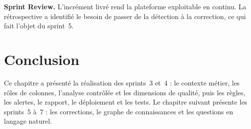 
\noindent\textbf{Sprint Review.} L'incrément livré rend la plateforme exploitable en continu. La rétrospective a identifié le besoin de passer de la détection à la correction, ce qui fait l'objet du sprint~5.

\section*{Conclusion}
Ce chapitre a présenté la réalisation des sprints~3 et~4 : le contexte métier, les rôles de colonnes, l'analyse contrôlée et les dimensions de qualité, puis les règles, les alertes, le rapport, le déploiement et les tests. Le chapitre suivant présente les sprints~5 à~7 : les corrections, le graphe de connaissances et les questions en langage naturel.
